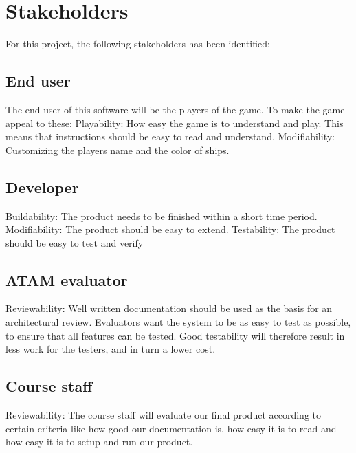 \chapter{Stakeholders}
For this project, the following stakeholders has been identified:

    \section{End user}
    The end user of this software will be the players of the game. To make the game appeal to these:
    Playability: How easy the game is to understand and play. This means that instructions should be easy to read and understand. 
    Modifiability: Customizing the players name and the color of ships. 
    
    \section{Developer}
    Buildability: The product needs to be finished within a short time period.
    Modifiability: The product should be easy to extend.
    Testability: The product should be easy to test and verify
    
    \section{ATAM evaluator}
    Reviewability: Well written documentation should be used as the basis for an architectural review. Evaluators want the system to be as easy to test as possible, to ensure that all features can be tested. Good testability
    will therefore result in less work for the testers, and in turn a lower cost.

    \section{Course staff}
    Reviewability: The course staff will evaluate our final product according to certain criteria like how good our documentation is, how easy it is to read and how easy it is to setup and run our product.